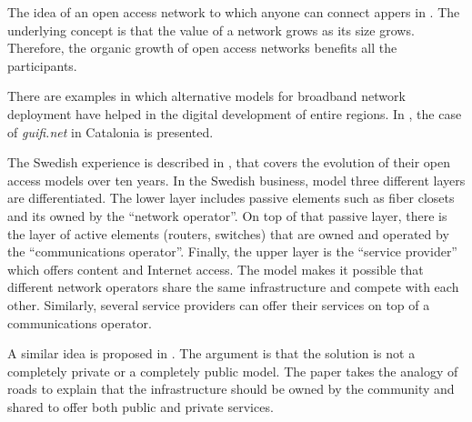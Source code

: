 The idea of an open access network to which anyone can connect appers in \cite{battiti2003ggo}.
The underlying concept is that the value of a network grows as its size grows.
Therefore, the organic growth of open access networks benefits all the participants.

There are examples in which alternative models for broadband network deployment have helped in the digital development of entire regions.
In \cite{oliver2010wca}, the case of \emph{guifi.net} in Catalonia is presented.

The Swedish experience is described in \cite{forzati2010oan}, that covers the evolution of their open access models over ten years.
In the Swedish business, model three different layers are differentiated.
The lower layer includes passive elements such as fiber closets and its owned by the ``network operator''.
On top of that passive layer, there is the layer of active elements (routers, switches) that are owned and operated by the ``communications operator''.
Finally, the upper layer is the ``service provider'' which offers content and Internet access.
The model makes it possible that different network operators share the same infrastructure and compete with each other.
Similarly, several service providers can offer their services on top of a communications operator.

A similar idea is proposed in \cite{cohill2010ttw}.
The argument is that the solution is not a completely private or a completely public model.
The paper takes the analogy of roads to explain that the infrastructure should be owned by the community and shared to offer both public and private services.
